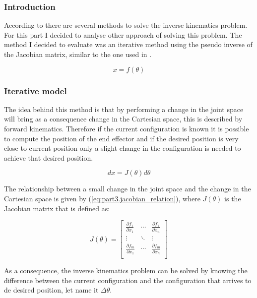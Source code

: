 \subsubsection{Introduction}
According to \citep{buss2004introduction,barinka2002inverse} there are several methods to solve the inverse kinematics problem. For this part I decided to analyse other approach of solving this problem. The method I decided to evaluate was an iterative method using the pseudo inverse of the Jacobian matrix, similar to the one used in \citep{bhatti2014forward}.

\begin{equation}
x=f(\theta)
\end{equation}

\subsubsection{Iterative model}
The idea behind this method is that by performing a change in the joint space will bring as a consequence  change in the Cartesian space, this is described by forward kinematics. Therefore if the current configuration is known it is possible to compute the position of the end effector and if the desired position is very close to current position only a slight change in the configuration is needed to achieve that desired position.

\begin{equation}
\label{eq:part3.jacobian_relation}
dx=J(\theta)d\theta
\end{equation}

The relationship between a small change in the joint space and the change in the Cartesian space is given  by (\ref{eq:part3.jacobian_relation}), where $J(\theta)$ is the Jacobian matrix that is defined as:

\begin{equation}
J(\theta)=  \left[
\begin{array}{ccc}
	\frac{\partial f_1}{\partial x_1} & \cdots & \frac{\partial f_1}{\partial x_n} \\
	\vdots & \ddots & \vdots \\
	\frac{\partial f_m}{\partial x_1} & \cdots & \frac{\partial f_m}{\partial x_n} \\
\end{array}
\right] 
\end{equation}

As a consequence, the inverse kinematics problem can be solved by knowing the difference between the current configuration and the configuration that arrives to de desired position, let name it $\Delta\theta$.

